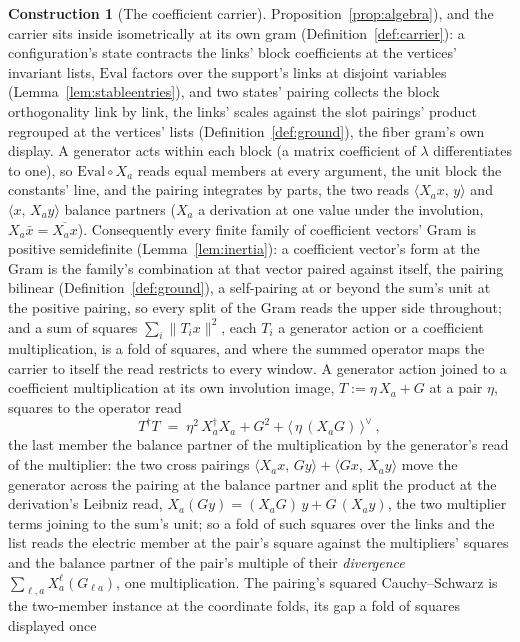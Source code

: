 \documentclass[11pt]{article}
\theoremstyle{definition}
\newtheorem{construction}{Construction}
\begin{document}
\begin{construction}[The coefficient carrier]
Proposition~\ref{prop:algebra}), and the carrier sits inside
isometrically at its own gram (Definition~\ref{def:carrier}): a
configuration's state contracts the links' block coefficients at
the vertices' invariant lists, $\mathrm{Eval}$ factors over the
support's links at disjoint variables
(Lemma~\ref{lem:stableentries}), and two states' pairing collects
the block orthogonality link by link, the links' scales against
the slot pairings' product regrouped at the vertices' lists
(Definition~\ref{def:ground}), the fiber gram's own display.  A generator acts within each block (a matrix
coefficient of $\lambda$
differentiates to one), so $\mathrm{Eval}\circ X_a$ reads equal members at every argument, the
unit block the constants' line, and the pairing integrates by parts,
the two reads $\langle X_ax,\,y\rangle$ and $\langle x,\,X_ay\rangle$
balance partners ($X_a$ a derivation at one value
under the involution, $X_a\bar x=\overline{X_ax}$). Consequently every finite family
of coefficient vectors' Gram is positive semidefinite
(Lemma~\ref{lem:inertia}): a coefficient vector's form at the Gram
is the family's combination at that vector paired against itself,
the pairing bilinear (Definition~\ref{def:ground}), a self-pairing
at or beyond the sum's unit at the positive pairing, so every split
of the Gram reads the upper side throughout; and a sum of squares
$\sum_i\|T_ix\|^2$, each $T_i$ a generator action or a coefficient
multiplication, is a fold of squares, and where the summed operator
maps the carrier to itself the read restricts to every window. A
generator action joined to a coefficient multiplication at its own
involution image, $T:=\eta\,X_a+G$ at a pair $\eta$,
squares to the operator read
\[
T^{\dagger}T\;=\;\eta^{2}\,X_a^{\dagger}X_a+G^{2}
+\big\langle\,\eta\,(X_aG)\,\big\rangle^{\!\vee}\ ,
\]
the last member the balance partner of the multiplication by the
generator's read of the multiplier: the two cross pairings
$\langle X_ax,\,Gy\rangle+\langle Gx,\,X_ay\rangle$ move the
generator across the pairing at the balance partner and split the
product at the derivation's Leibniz read,
$X_a(Gy)=(X_aG)\,y+G\,(X_ay)$, the two multiplier terms joining to
the sum's unit; so a fold of such squares over the links and the
list reads the electric member at the pair's square against the
multipliers' squares and the balance partner of the pair's multiple
of their \emph{divergence} $\sum_{\ell,a}X_a^{\ell}(G_{\ell a})$,
one multiplication.
The pairing's squared Cauchy--Schwarz is the two-member instance
at the coordinate folds, its gap a fold of squares displayed once

\end{construction}
\end{document}
